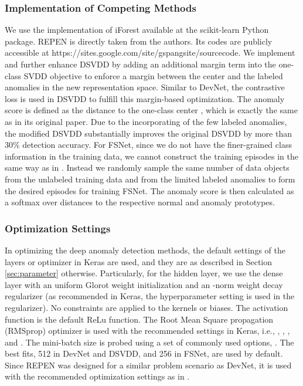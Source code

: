 \documentclass[sigconf]{acmart}
\begin{document}
\subsubsection{Implementation of Competing Methods}
We use the implementation of iForest available at the scikit-learn Python package. REPEN is directly taken from the authors. Its codes are publicly accessible at https://sites.google.com/site/gspangsite/sourcecode. We implement and further enhance DSVDD by adding an additional margin term into the one-class SVDD objective to enforce a margin between the center  and the labeled anomalies in the new representation space. Similar to DevNet, the contrastive loss \cite{hadsell2006contrastloss} is used in DSVDD to fulfill this margin-based optimization. The anomaly score is defined as the distance to the one-class center , which is exactly the same as in its original paper. Due to the incorporating of the few labeled anomalies, the modified DSVDD substantially improves the original DSVDD by more than 30\% detection accuracy. For FSNet, since we do not have the finer-grained class information in the training data, we cannot construct the training episodes in the same way as in \cite{snell2017protonet}. Instead we randomly sample the same number of data objects from the unlabeled training data and from the limited labeled anomalies to form the desired episodes for training FSNet. The anomaly score is then calculated as a softmax over distances to the respective normal and anomaly prototypes.


\subsubsection{Optimization Settings} In optimizing the deep anomaly detection methods, the default settings of the layers or optimizer in Keras are used, and they are as described in Section \ref{sec:parameter} otherwise. Particularly, for the hidden layer, we use the dense layer with an uniform Glorot weight initialization and an -norm weight decay regularizer (as recommended in Keras, the hyperparameter setting  is used in the regularizer). No constraints are applied to the kernels or biases. The activation function is the default ReLu function. The Root Mean Square propagation (RMSprop) optimizer is used with the recommended settings in Keras, i.e., , , , and . The mini-batch size is probed using a set of commonly used options, . The best fits, 512 in DevNet and DSVDD, and 256 in FSNet, are used by default. Since REPEN was designed for a similar problem scenario as DevNet, it is used with the recommended optimization settings as in \cite{pang2018repen}.
\end{document}

